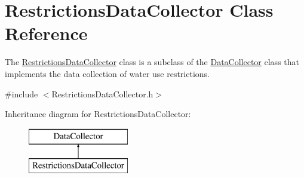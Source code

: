 \hypertarget{classRestrictionsDataCollector}{}\section{Restrictions\+Data\+Collector Class Reference}
\label{classRestrictionsDataCollector}


The {\ttfamily \mbox{\hyperlink{classRestrictionsDataCollector}{Restrictions\+Data\+Collector}}} class is a subclass of the {\ttfamily \mbox{\hyperlink{classDataCollector}{Data\+Collector}}} class that implements the data collection of water use restrictions.  




{\ttfamily \#include $<$Restrictions\+Data\+Collector.\+h$>$}

Inheritance diagram for Restrictions\+Data\+Collector\+:\begin{figure}[H]
\begin{center}
\leavevmode
\includegraphics[height=2.000000cm]{classRestrictionsDataCollector}
\end{center}
\end{figure}
